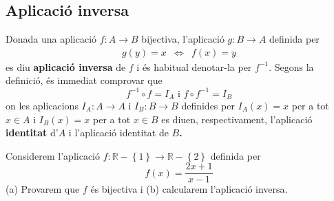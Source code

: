 \subsection{Aplicaci\'{o} inversa}

Donada una aplicaci\'{o} $f:A\longrightarrow B$ bijectiva, l'aplicaci\'{o} $%
g:B\longrightarrow A$ definida per
\begin{equation*}
\begin{array}{ccc}
g(y)=x & \Longleftrightarrow & f(x)=y%
\end{array}
\end{equation*}
es diu \textbf{aplicaci\'{o} inversa} de $f$ i \'{e}s habitual denotar-la
per $f^{-1}$. Segons la definici\'{o}, \'{e}s immediat comprovar que%
\begin{equation*}
f^{-1}\circ f=I_{A}\text{ \ \ i \ \ }f\circ f^{-1}=I_{B}
\end{equation*}
on les aplicacions $I_{A}:A\longrightarrow A$ i $I_{B}:B\longrightarrow B$
definides per $I_{A}(x)=x$ per a tot $x\in A$ i $I_{B}(x)=x$ per a tot $x\in
B$ es diuen, respectivament, l'aplicaci\'{o} \textbf{identitat} d'$A$ i
l'aplicaci\'{o} identitat de $B$\textbf{. }

\begin{exemple}
Considerem l'aplicaci\'{o} $f:\mathbb{R}-\left\{ 1\right\} \longrightarrow
\mathbb{R}-\left\{ 2\right\} $ definida per%
\begin{equation*}
f(x)=\frac{2x+1}{x-1}
\end{equation*}
(a) Provarem que $f$ \'{e}s bijectiva i (b) calcularem l'aplicaci\'{o}
inversa.
\end{exemple}

